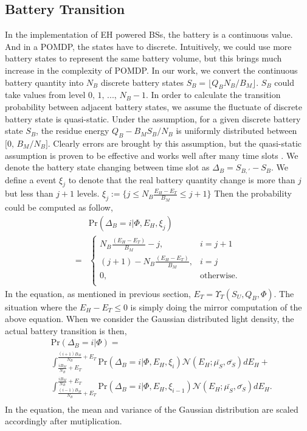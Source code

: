 \documentclass[conference]{IEEEtran}
\begin{document}
\subsection{Battery Transition}
In the implementation of EH powered BSs, the battery is a continuous value.
And in a POMDP, the states have to discrete.
Intuitively, we could use more battery states to represent the same battery volume,
but this brings much increase in the complexity of POMDP.
In our work, we convert the continuous battery quantity into \(N_B\) discrete battery states
\(S_B = \lfloor Q_B N_B / B_M \rfloor\). \(S_B\) could take values from level \(0,\,1,\,...,\,N_B - 1\).
In order to calculate the transition probability between adjacent battery states,
we assume the fluctuate of discrete battery state is quasi-static.
Under the assumption, for a given discrete battery state \(S_B\),
the residue energy \(Q_B - B_MS_B/N_B\) is uniformly distributed between \(\lbrack0,\,B_M/N_B\rbrack\).
Clearly errors are brought by this assumption,
but the quasi-static assumption is proven to be effective
and works well after many time slots \cite{data}.
We denote the battery state changing between time slot as \(\Delta_B = S_{B,'} - S_B\).
We define a event \(\xi_j\) to denote that the real battery quantity change is more than \(j\) but less than \(j+1\) levels.
\(\xi_j := \{j\leq N_B\frac{E_H - E_T}{B_M} \le j+1\}\)
Then the probability could be computed as follow,
\begin{align}&\mbox{Pr}\left(\Delta_B = i |\Phi, E_H, \xi_j \right)\nonumber\\
=&\begin{cases} N_B\frac{\left(E_H - E_T\right)}{B_M} -j, &\mbox{$i = j + 1$}\\
\left(j+1\right) -N_B\frac{\left(E_H - E_T\right)} {B_M}, &\mbox{$i = j$}\\
0, &\mbox{otherwise.}\\
\end{cases}
\end{align}
In the equation, as mentioned in previous section, \(E_T = \Upsilon_T(S_U, Q_B, \Phi)\).
The situation where the \(E_H - E_T \le 0\) is simply doing the mirror computation of the above equation.
When we consider the Gaussian distributed light density, the actual battery transition is then,
\begin{equation}\label{battery}
\begin{aligned}
	&\mbox{Pr}\left(\Delta_B = i |\Phi\right) = \\
	&\int_{\frac{iB_M}{N_B} + E_T}^{\frac{\left(i+1\right)B_M}{N_B} + E_T}
	\mbox{Pr}\left(\Delta_B = i |\Phi, E_H, \xi_i\right) \mathcal{N}\left(E_H;\bar{\mu_S},\bar{\sigma_S}\right) dE_H+\\
	& \int_{\frac{\left(i-1\right)B_M}{N_B} + E_T}^{\frac{iB_M}{N_B} + E_T}
	\mbox{Pr}\left(\Delta_B = i |\Phi, E_H, \xi_{i-1}\right) \mathcal{N}\left(E_H;\bar{\mu_S},\bar{\sigma_S}\right) dE_H.\\
\end{aligned}
\end{equation}
In the equation, the mean and variance of the Gaussian distribution are scaled accordingly after mutiplication.
\end{document}
